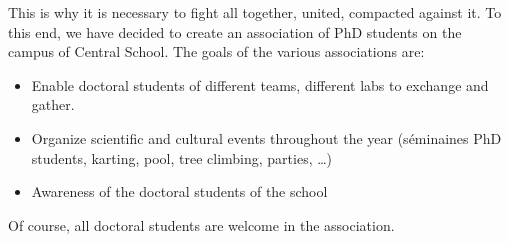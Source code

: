 \documentclass[11pt]{report}
\begin{document}
This is why it is necessary to fight all together, united, compacted against it.
To this end, we have decided to create an association of PhD students on the campus of Central School.
The goals of the various associations are:
\begin{itemize}
\item Enable doctoral students of different teams, different labs to exchange and gather.
\item Organize scientific and cultural events throughout the year (séminaines PhD students, karting, pool, tree climbing, parties, \dots)
\item Awareness of the doctoral students of the school
\end{itemize}
Of course, all doctoral students are welcome in the association.





\end{document}
